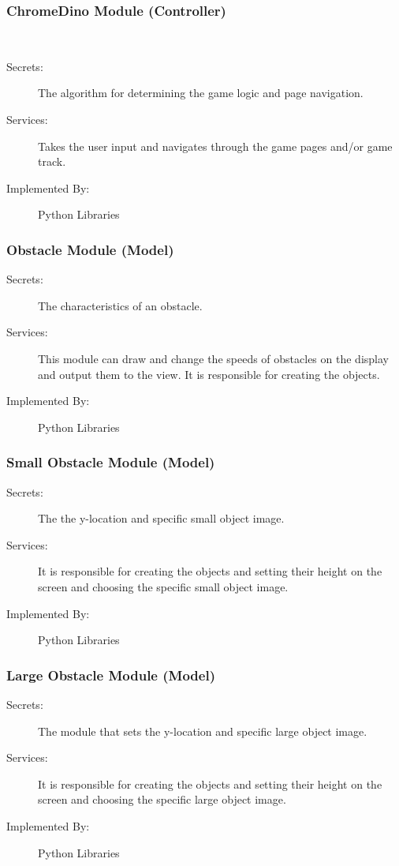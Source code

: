 \documentclass[12pt, titlepage]{article}
\begin{document}
\subsubsection{ChromeDino Module (Controller)}\\
\begin{description}
\item[Secrets:] The algorithm for determining the game logic and page navigation. 
\item[Services:] Takes the user input and navigates through the game pages and/or game track.  
\item[Implemented By:] Python Libraries
\end{description}


\subsubsection{Obstacle Module (Model)}
\begin{description}
\item[Secrets:] The characteristics of an obstacle.
\item[Services:] This module can draw and change the speeds of obstacles on the display and output them to the view. It is responsible for creating the objects.
\item[Implemented By:] Python Libraries
\end{description}


\subsubsection{Small Obstacle Module (Model)}
\begin{description}
\item[Secrets:] The the y-location and specific small object image. 
\item[Services:] It is responsible for creating the objects and setting their height on the screen and choosing the specific small object image.
\item[Implemented By:] Python Libraries
\end{description}


\subsubsection{Large Obstacle Module (Model)}
\begin{description}
\item[Secrets:] The module that sets the y-location and specific large object image. 
\item[Services:] It is responsible for creating the objects and setting their height on the screen and choosing the specific large object image. 
\item[Implemented By:] Python Libraries
\end{description}
\end{document}
